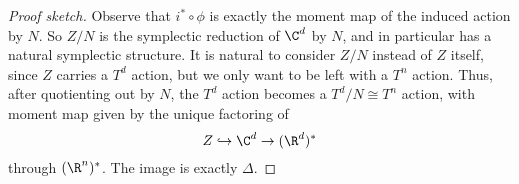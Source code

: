 \documentclass[a4paper]{article}
\begin{document}
\begin{proof}[Proof sketch]
  Observe that $i^* \circ \phi$ is exactly the moment map of the induced action by $N$. So $Z/N$ is the symplectic reduction of $\C^d$ by $N$, and in particular has a natural symplectic structure. It is natural to consider $Z/N$ instead of $Z$ itself, since $Z$ carries a $T^d$ action, but we only want to be left with a $T^n$ action. Thus, after quotienting out by $N$, the $T^d$ action becomes a $T^d/N \cong T^n$ action, with moment map given by the unique factoring of
  \[
    Z \hookrightarrow \C^d \to (\R^d)^*
  \]
  through $(\R^n)^*$. The image is exactly $\Delta$.
%
%
%

\end{proof}
\end{document}
